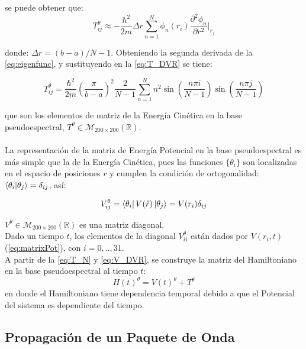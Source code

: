 se puede obtener que: \cite{Tannor:2006}\cite{Colbert1992}
\begin{equation}
  \label{eq:T_DVR}
  T^{\theta}_{ij}\approx -\frac{\hbar^2}{2m}\Delta r\sum_{n=1}^{N}\phi_n(r_i)\frac{\partial^2\phi_n}{\partial r^2}\biggr\rvert_{r_j}
\end{equation}

donde: $\Delta r = (b-a)/N-1$. Obteniendo la segunda derivada de la \autoref{eq:eigenfunc}, y sustituyendo en la \autoref{eq:T_DVR} se tiene:

\begin{equation}
  \label{eq:T_N}
  T^{\theta}_{ij}=\frac{\hbar^2}{2m}\left(\frac{\pi}{b-a} \right)^2\frac{2}{N-1}\sum_{n=1}^Nn^2\sin\left(\frac{n\pi i}{N-1} \right)\sin\left(\frac{n\pi j}{N-1} \right)
\end{equation}

que son los elementos de matriz de la Energía Cinética en la base pseudoespectral, $T^{\theta}\in \mathcal{M}_{200\times200}(\mathbb{R})$.
\\
\\
La representación de la matriz de Energía Potencial en la base pseudoespectral es más simple que la de la Energía Cinética, pues 
las funciones $\{\theta_i\}$ son localizadas en el espacio de posiciones $r$ y cumplen la condición de ortogonalidad: $\bra{\theta_i}\ket{\theta_j}= \delta_{ij}$, así:

\begin{equation}
  \label{eq:V_DVR}
  V^{\theta}_{ij}= \bra{\theta_i}V(\hat{r})\ket{\theta_j}=V(r_i)\delta_{ij}
\end{equation}

$V^{\theta}\in \mathcal{M}_{200\times200}(\mathbb{R})$ es una matriz diagonal.
\\
Dado un tiempo $t$, los elementos de la diagonal $V^{\theta}_{ii}$ están dados por $V(r_i,t)$ (\autoref{eq:matrixPot}), con $i=0,..,31$.
\\
A partir de la \autoref{eq:T_N} y \autoref{eq:V_DVR}, se construye la matriz del Hamiltoniano en la base pseudoespectral al tiempo $t$:
\begin{equation}
  \label{eq:H_DVR}
  H(t)^{\theta} = V(t)^{\theta}+T^{\theta}
\end{equation}
en donde el Hamiltoniano tiene dependencia temporal debido a que el Potencial del sistema es dependiente del tiempo.

\subsection{Propagación de un Paquete de Onda}

